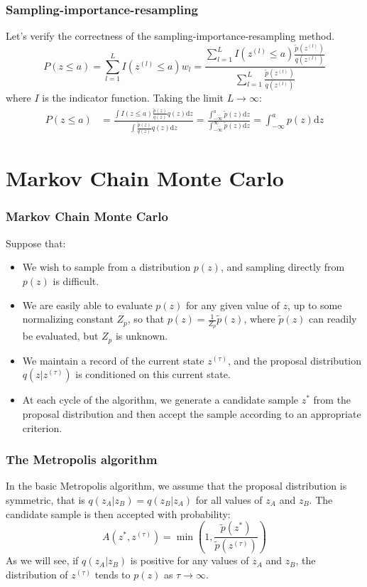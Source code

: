 \documentclass{beamer}
\begin{document}
\begin{frame}
    \frametitle{Sampling-importance-resampling}
    Let's verify the correctness of the sampling-importance-resampling method.
    \begin{equation*}
        P(z\le{}a)=\sum_{l=1}^{L}I(z^{(l)}\le{}a)w_{l}=\frac{\sum_{l=1}^{L}I(z^{(l)}\le{}a)\frac{\tilde{p}(z^{(l)})}{q(z^{(l)})}}{\sum_{l=1}^{L}\frac{\tilde{p}(z^{(l)})}{q(z^{(l)})}}
    \end{equation*}
    where $I$ is the indicator function. Taking the limit $L\to\infty$:
    \begin{align*}
        P(z\le{}a)&=\frac{\int{}I(z\le{}a)\frac{\tilde{p}(z)}{q(z)}q(z)\mathrm{d}z}{\int\frac{\tilde{p}(z)}{q(z)}q(z)\mathrm{d}z}=\frac{\int_{-\infty}^{a}\tilde{p}(z)\mathrm{d}z}{\int_{-\infty}^{\infty}\tilde{p}(z)\mathrm{d}z}=\int_{-\infty}^{a}p(z)\mathrm{d}z
    \end{align*}
\end{frame}

\section{Markov Chain Monte Carlo}

\begin{frame}
    \frametitle{Markov Chain Monte Carlo}
    Suppose that:
    \begin{itemize}
        \item We wish to sample from a distribution $p(z)$, and sampling directly from $p(z)$ is difficult.
        \item We are easily able to evaluate $p(z)$ for any given value of $z$, up to some normalizing constant $Z_{p}$, so that $p(z)=\frac{1}{Z_{p}}\tilde{p}(z)$, where $\tilde{p}(z)$ can readily be evaluated, but $Z_{p}$ is unknown.
        \item We maintain a record of the current state $z^{(\tau)}$, and the proposal distribution $q(z|z^{(\tau)})$ is conditioned on this current state.
        \item At each cycle of the algorithm, we generate a candidate sample $z^{*}$ from the proposal distribution and then accept the sample according to an appropriate criterion.
    \end{itemize}
\end{frame}

\begin{frame}
    \frametitle{The Metropolis algorithm}
    In the basic Metropolis algorithm, we assume that the proposal distribution is symmetric, that is $q(z_{A}|z_{B})=q(z_{B}|z_{A})$ for all values of $z_{A}$ and $z_{B}$. The candidate sample is then accepted with probability:
    \begin{equation*}
        A(z^{*},z^{(\tau)})=\min(1,\frac{\tilde{p}(z^{*})}{\tilde{p}(z^{(\tau)})})
    \end{equation*}
    As we will see, if $q(z_{A}|z_{B})$ is positive for any values of $z_{A}$ and $z_{B}$, the distribution of $z^{(\tau)}$ tends to $p(z)$ as $\tau\to\infty$.
\end{frame}
\end{document}
